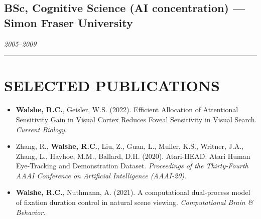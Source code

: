 \documentclass[11pt,a4paper]{article}
\newcommand{\sepline}{\noindent\rule{\textwidth}{0.5pt}\vspace{0.5em}}
\begin{document}
\subsection*{BSc, Cognitive Science (AI concentration) --- Simon Fraser University}
\textit{2005--2009}

\vspace{0.5em}
\sepline

\section*{SELECTED PUBLICATIONS}
\begin{itemize}
    \item \textbf{Walshe, R.C.}, Geisler, W.S. (2022). Efficient Allocation of Attentional Sensitivity Gain in Visual Cortex Reduces Foveal Sensitivity in Visual Search. \textit{Current Biology}.
    \item Zhang, R., \textbf{Walshe, R.C.}, Liu, Z., Guan, L., Muller, K.S., Writner, J.A., Zhang, L., Hayhoe, M.M., Ballard, D.H. (2020). Atari-HEAD: Atari Human Eye-Tracking and Demonstration Dataset. \textit{Proceedings of the Thirty-Fourth AAAI Conference on Artificial Intelligence (AAAI-20)}.
    \item \textbf{Walshe, R.C.}, Nuthmann, A. (2021). A computational dual-process model of fixation duration control in natural scene viewing. \textit{Computational Brain \& Behavior}.
\end{itemize}
\end{document}
